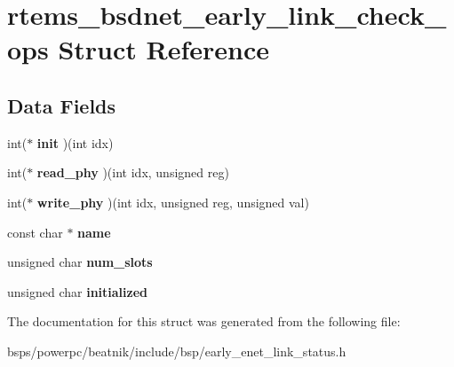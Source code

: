 \hypertarget{structrtems__bsdnet__early__link__check__ops}{}\section{rtems\+\_\+bsdnet\+\_\+early\+\_\+link\+\_\+check\+\_\+ops Struct Reference}
\label{structrtems__bsdnet__early__link__check__ops}
\subsection*{Data Fields}
\begin{DoxyCompactItemize}
\item 
\mbox{\label{structrtems__bsdnet__early__link__check__ops_aee945c7efa040286d0d168de83c054ba}} 
int($\ast$ {\bfseries init} )(int idx)
\item 
\mbox{\label{structrtems__bsdnet__early__link__check__ops_adf43a25f72beb3d03e4f5bd90e8bc92c}} 
int($\ast$ {\bfseries read\+\_\+phy} )(int idx, unsigned reg)
\item 
\mbox{\label{structrtems__bsdnet__early__link__check__ops_a7173de2de63c11e78bde8ad779390521}} 
int($\ast$ {\bfseries write\+\_\+phy} )(int idx, unsigned reg, unsigned val)
\item 
\mbox{\label{structrtems__bsdnet__early__link__check__ops_a424f40a099961eb4cf58f71a65461761}} 
const char $\ast$ {\bfseries name}
\item 
\mbox{\label{structrtems__bsdnet__early__link__check__ops_abc5bcd9e28e47fc6a5d29c3c010cc97b}} 
unsigned char {\bfseries num\+\_\+slots}
\item 
\mbox{\label{structrtems__bsdnet__early__link__check__ops_a13d601b612779a58d12e572ae9e80efe}} 
unsigned char {\bfseries initialized}
\end{DoxyCompactItemize}


The documentation for this struct was generated from the following file\+:\begin{DoxyCompactItemize}
\item 
bsps/powerpc/beatnik/include/bsp/early\+\_\+enet\+\_\+link\+\_\+status.\+h\end{DoxyCompactItemize}
